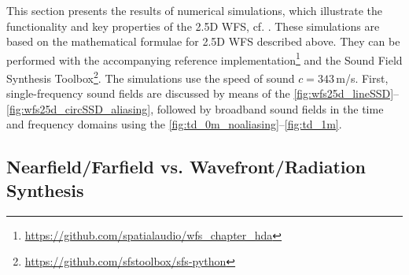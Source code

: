 This section presents the results of numerical simulations, which
illustrate the functionality and key properties of the 2.5D WFS,
cf. \cite{Berkhout1993_JASA,Boone1995_JAES,Start1997_diss,Spors2010a}.
%
These simulations are based on the mathematical formulae for
2.5D WFS described above.
They can be performed with the accompanying reference
implementation\footnote{\url{https://github.com/spatialaudio/wfs_chapter_hda}}
and the
Sound Field Synthesis Toolbox\footnote{\url{https://github.com/sfstoolbox/sfs-python}}.
%
The simulations use the speed of sound $c=343$\,m/s.
%
First, single-frequency sound fields are discussed by means of the
\myfigs\ref{fig:wfs25d_lineSSD}--\ref{fig:wfs25d_circSSD_aliasing},
followed by broadband sound fields in the time and frequency domains
using the \myfigs\ref{fig:td_0m_noaliasing}--\ref{fig:td_1m}.



\subsection{Nearfield/Farfield vs. Wavefront/Radiation Synthesis}

